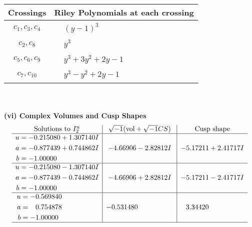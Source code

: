 \documentclass[1p]{elsarticle_modified}
\theoremstyle{definition}
\newcommand{\I}{\sqrt{-1}}
\begin{document}
\begin{tabular}{m{50pt}|m{274pt}}
Crossings & \hspace{64pt}Riley Polynomials at each crossing \\
\hline $$\begin{aligned}c_{1},c_{3},c_{4}\end{aligned}$$&$\begin{aligned}
&(y-1)^3
\end{aligned}$\\
\hline $$\begin{aligned}c_{2},c_{8}\end{aligned}$$&$\begin{aligned}
&y^3
\end{aligned}$\\
\hline $$\begin{aligned}c_{5},c_{6},c_{9}\end{aligned}$$&$\begin{aligned}
&y^3+3 y^2+2 y-1
\end{aligned}$\\
\hline $$\begin{aligned}c_{7},c_{10}\end{aligned}$$&$\begin{aligned}
&y^3- y^2+2 y-1
\end{aligned}$\\
\hline
\end{tabular}\\~\\
\newpage\flushleft \textbf{(vi) Complex Volumes and Cusp Shapes}
$$\begin{array}{c|c|c}  
\text{Solutions to }I^u_{2}& \I (\text{vol} + \sqrt{-1}CS) & \text{Cusp shape}\\
 \hline 
\begin{aligned}
u &= -0.215080 + 1.307140 I \\
a &= -0.877439 + 0.744862 I \\
b &= -1.00000\phantom{ +0.000000I}\end{aligned}
 & -4.66906 - 2.82812 I & -5.17211 + 2.41717 I \\ \hline\begin{aligned}
u &= -0.215080 - 1.307140 I \\
a &= -0.877439 - 0.744862 I \\
b &= -1.00000\phantom{ +0.000000I}\end{aligned}
 & -4.66906 + 2.82812 I & -5.17211 - 2.41717 I \\ \hline\begin{aligned}
u &= -0.569840\phantom{ +0.000000I} \\
a &= \phantom{-}0.754878\phantom{ +0.000000I} \\
b &= -1.00000\phantom{ +0.000000I}\end{aligned}
 & -0.531480\phantom{ +0.000000I} & \phantom{-}3.34420\phantom{ +0.000000I}\\
 \hline 
 \end{array}$$\newpage
\end{document}
